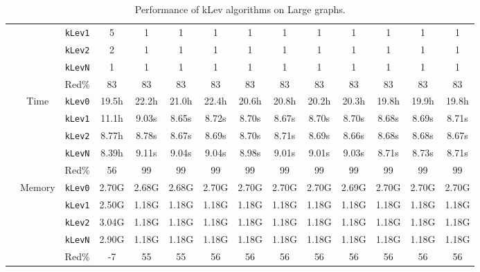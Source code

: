 \begin{table}[h!]
{\begin{tabular}{|l|c|c|c|c|c|c|c|c|c|c|c|c|c|}
& & \texttt{kLev1} & 5 & 1 & 1 & 1 & 1 & 1 & 1 & 1 & 1 & 1 & 1 \\
& & \texttt{kLev2} & 2 & 1 & 1 & 1 & 1 & 1 & 1 & 1 & 1 & 1 & 1 \\
& & \texttt{kLevN} & 1 & 1 & 1 & 1 & 1 & 1 & 1 & 1 & 1 & 1 & 1 \\
& & Red$\%$ & 83 & 83 & 83 & 83 & 83 & 83 & 83 & 83 & 83 & 83 & 83 \\
\cline{2-14} &
\multirow{5}{*}{Time}
& \texttt{kLev0} & 19.5h & 22.2h & 21.0h & 22.4h & 20.6h & 20.8h & 20.2h & 20.3h & 19.8h & 19.9h & 19.8h \\
& & \texttt{kLev1} & 11.1h & 9.03s & 8.65s & 8.72s & 8.70s & 8.67s & 8.70s & 8.70s & 8.68s & 8.69s & 8.71s \\
& & \texttt{kLev2} & 8.77h & 8.78s & 8.67s & 8.69s & 8.70s & 8.71s & 8.69s & 8.66s & 8.68s & 8.68s & 8.67s \\
& & \texttt{kLevN} & 8.39h & 9.11s & 9.04s & 9.04s & 8.98s & 9.01s & 9.01s & 9.03s & 8.71s & 8.73s & 8.71s \\
& & Red$\%$ & 56 & 99 & 99 & 99 & 99 & 99 & 99 & 99 & 99 & 99 & 99 \\
\cline{2-14} &
\multirow{5}{*}{Memory}
& \texttt{kLev0} & 2.70G & 2.68G & 2.68G & 2.70G & 2.70G & 2.70G & 2.70G & 2.69G & 2.70G & 2.70G & 2.70G \\
& & \texttt{kLev1} & 2.50G & 1.18G & 1.18G & 1.18G & 1.18G & 1.18G & 1.18G & 1.18G & 1.18G & 1.18G & 1.18G \\
& & \texttt{kLev2} & 3.04G & 1.18G & 1.18G & 1.18G & 1.18G & 1.18G & 1.18G & 1.18G & 1.18G & 1.18G & 1.18G \\
& & \texttt{kLevN} & 2.90G & 1.18G & 1.18G & 1.18G & 1.18G & 1.18G & 1.18G & 1.18G & 1.18G & 1.18G & 1.18G \\
& & Red$\%$ & -7 & 55 & 55 & 56 & 56 & 56 & 56 & 56 & 56 & 56 & 56 \\
\hline
\end{tabular}%
}
\caption{Performance of kLev algorithms on Large graphs.}
\label{tab:large_klev}
\end{table}
